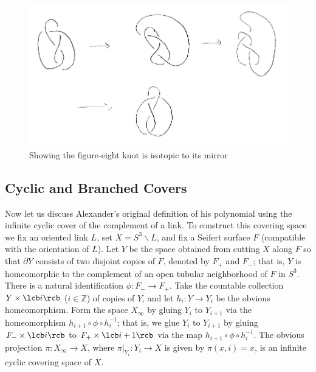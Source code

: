 \begin{figure}[tb]
\centering
\includegraphics[scale=1]{graphics/figure-eight-amphichiral}
\caption{Showing the figure-eight knot is isotopic to its mirror}
\label{figure-eight-amphichiral}
\end{figure}





\subsection{Cyclic and Branched Covers}
\label{Cyclic and Branched Covers}


Now let us discuss Alexander's original definition of his polynomial using the infinite cyclic cover of the complement of a link. To construct this covering space we fix an oriented link $L$, set $X = S^3 \backslash L$, and fix a Seifert surface $F$ (compatible with the orientation of $L$). Let $Y$ be the space obtained from cutting $X$ along $F$ so that $\partial Y$ consists of two disjoint copies of $F$, denoted by $F_+$ and $F_-$; that is, $Y$ is homeomorphic to the complement of an open tubular neighborhood of $F$ in $S^3$. There is a natural identification $\phi : F_- \rightarrow F_+$. Take the countable collection $Y \times \lcb i \rcb$ ($i \in \mathbb Z$) of copies of $Y$, and let $h_i : Y \rightarrow Y_i$ be the obvious homeomorphism. Form the space $X_\infty$ by gluing $Y_i$ to $Y_{i+1}$ via the homeomorphism $h_{i+1} \circ \phi \circ h_i^{-1}$; that is, we glue $Y_i$ to $Y_{i+1}$ by gluing $F_- \times \lcb i \rcb$ to $F_+ \times \lcb i+1 \rcb$ via the map $h_{i+1} \circ \phi \circ h_i^{-1}$. The obvious projection $\pi : X_\infty \rightarrow X$, where $\pi|_{Y_i} : Y_i \rightarrow X$ is given by $\pi(x,i)=x$, is an infinite cyclic covering space of $X$.

